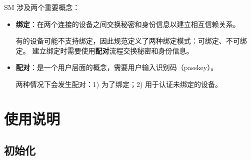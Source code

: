 \documentclass[
  12pt,
]{book}
\begin{document}
SM 涉及两个重要概念：

\begin{itemize}
\item
  \textbf{绑定}：在两个连接的设备之间交换秘密和身份信息以建立相互信赖关系。

  有的设备可能不支持绑定，因此规范定义了两种绑定模式：可绑定、不可绑定。
  建立绑定时需要使用\textbf{配对}流程交换秘密和身份信息。
\item
  \textbf{配对}：是一个用户层面的概念，需要用户输入识别码（passkey）。

  两种情况下会发生配对：1) 为了绑定；2) 用于认证未绑定的设备。
\end{itemize}

\hypertarget{ux4f7fux7528ux8bf4ux660e-6}{%
\section{使用说明}\label{ux4f7fux7528ux8bf4ux660e-6}}

\hypertarget{ux521dux59cbux5316}{%
\subsection{初始化}\label{ux521dux59cbux5316}}
\end{document}
